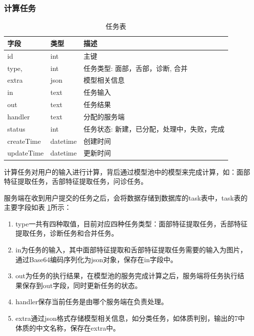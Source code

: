 \subsubsection{计算任务}
\begin{table}[]
    \centering
    \begin{tabular}{lll}
        \toprule
        字段 & 类型 & 描述 \\ 
        \midrule
        id & int & 主键 \\
        type, & int & 任务类型: 面部，舌部，诊断, 合并 \\ 
        extra & json & 模型相关信息 \\
        in & text & 任务输入 \\
        out & text & 任务结果 \\
        handler & text & 分配的服务端 \\
        status & int & 任务状态: 新建，已分配，处理中，失败，完成 \\
        createTime & datetime & 创建时间 \\
        updateTime & datetime & 更新时间\\
        \bottomrule
    \end{tabular}
    \caption{任务表}
    \label{tab:task}
\end{table}
计算任务对用户的输入进行计算，背后通过模型池中的模型来完成计算，如：面部特征提取任务，舌部特征提取任务，问诊任务。

服务端在收到用户提交的任务之后，会将数据存储到数据库的task表中，task表的主要字段如表 \ref{tab:task}所示：

\begin{enumerate}
    
    \item type一共有四种取值，目前对应四种任务类型：面部特征提取任务，舌部特征提取任务，诊断任务和合并任务。

    \item in为任务的输入，其中面部特征提取和舌部特征提取任务需要的输入为图片，通过Base64编码序列化为json对象，保存在in字段中。

    \item out为任务的执行结果，在模型池的服务完成计算之后，服务端将任务执行结果保存到out字段，同时更新任务的状态。

    \item  handler保存当前任务是由哪个服务端在负责处理。

    \item extra通过json格式存储模型相关信息，如分类任务，如体质判别，输出的7中体质的中文名称，保存在extra中。
\end{enumerate}

